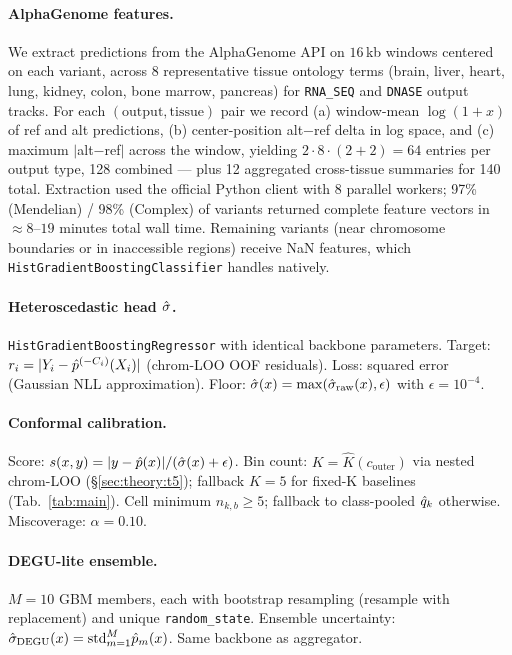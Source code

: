 \paragraph{AlphaGenome features.}
We extract predictions from the AlphaGenome API \citep{avsec2026alphagenome} on $16$\,kb windows centered on each variant, across 8 representative tissue ontology terms (brain, liver, heart, lung, kidney, colon, bone marrow, pancreas) for \texttt{RNA\_SEQ} and \texttt{DNASE} output tracks. For each $(\text{output}, \text{tissue})$ pair we record (a) window-mean $\log(1 + x)$ of ref and alt predictions, (b) center-position alt$-$ref delta in log space, and (c) maximum $|$alt$-$ref$|$ across the window, yielding $2 \cdot 8 \cdot (2 + 2) = 64$ entries per output type, 128 combined --- plus 12 aggregated cross-tissue summaries for 140 total. Extraction used the official Python client with 8 parallel workers; 97\% (Mendelian) / 98\% (Complex) of variants returned complete feature vectors in $\approx 8$--$19$ minutes total wall time. Remaining variants (near chromosome boundaries or in inaccessible regions) receive NaN features, which \texttt{HistGradientBoostingClassifier} handles natively.

\paragraph{Heteroscedastic head $\hat{\sigma}$.}
\texttt{HistGradientBoostingRegressor} with identical backbone parameters. Target: $r_i = |Y_i - \hat{p}^{(-C_i)}(X_i)|$ (chrom-LOO OOF residuals). Loss: squared error (Gaussian NLL approximation). Floor: $\hat{\sigma}(x) = \max(\hat{\sigma}_{\mathrm{raw}}(x), \epsilon)$ with $\epsilon = 10^{-4}$.

\paragraph{Conformal calibration.}
Score: $s(x, y) = |y - \hat{p}(x)| / (\hat{\sigma}(x) + \epsilon)$. Bin count: $K = \hat K(c_{\mathrm{outer}})$ via nested chrom-LOO (§\ref{sec:theory:t5}); fallback $K = 5$ for fixed-K baselines (Tab.~\ref{tab:main}). Cell minimum $n_{k,b} \geq 5$; fallback to class-pooled $\hat{q}_k$ otherwise. Miscoverage: $\alpha = 0.10$.

\paragraph{DEGU-lite ensemble.}
$M = 10$ GBM members, each with bootstrap resampling (resample with replacement) and unique \texttt{random\_state}. Ensemble uncertainty: $\hat{\sigma}_{\mathrm{DEGU}}(x) = \mathrm{std}_{m=1}^M \hat{p}_m(x)$. Same backbone as aggregator.

